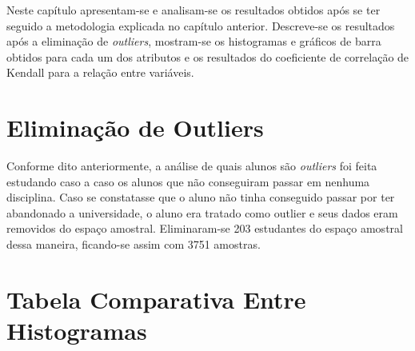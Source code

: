 

Neste capítulo apresentam-se e analisam-se os resultados obtidos após se ter seguido a
metodologia explicada no capítulo anterior. Descreve-se os resultados após a
eliminação de \textit{outliers}, mostram-se os histogramas e gráficos de barra obtidos para
cada um dos atributos e os resultados do coeficiente de correlação de Kendall para a
relação entre variáveis. 

\section{Eliminação de Outliers}
Conforme dito anteriormente, a análise de quais alunos são \textit{outliers} foi feita
estudando caso a caso os alunos que não conseguiram passar em nenhuma disciplina.
Caso se constatasse que o aluno não tinha conseguido passar por ter abandonado a
universidade, o aluno era tratado como outlier e seus dados eram removidos do espaço
amostral. Eliminaram-se 203 estudantes do espaço amostral dessa maneira, ficando-se
assim com 3751 amostras. 


\section{Tabela Comparativa Entre Histogramas}

